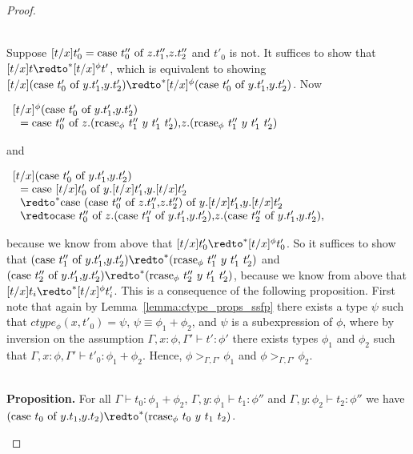 \begin{proof}
\begin{itemize}
    \ \\
    Suppose $[t/x]t'_0 = \mbox{case}\ t''_0\ \text{of}\ z\text{.}t''_1\text{,}z\text{.}t''_2$ and $t'_0$ is not.  It suffices to show that 
    $[t/x]t \redto^* [t/x]^\phi t'$, which is equivalent to showing 
    $[t/x](\ccon{t'_0}{y}{t'_1}{t'_2}) \redto^* [t/x]^\phi (\ccon{t'_0}{y}{t'_1}{t'_2})$.  Now
    \begin{center}
      \begin{math}
        \begin{array}{lll}
          [t/x]^\phi (\mbox{case}\ t'_0\ \text{of}\ y\text{.}t'_1\text{,}y\text{.}t'_2)\\
          \,\,\,\,= \mbox{case}\ t''_0\ \text{of}\ z\text{.}(\mbox{rcase}_{\phi}\ t''_1\ y\ t'_1\ t'_2)\text{,}z\text{.}(\mbox{rcase}_{\phi}\ t''_1\ y\ t'_1\ t'_2)
        \end{array}
      \end{math}
    \end{center}
    and
    \begin{center}
      \begin{math}
        \begin{array}{lll}
          [t/x] (\ccon{t'_0}{y}{t'_1}{t'_2})\\
          \,\,\,\,= \ccon{[t/x]t'_0}{y}{[t/x]t'_1}{[t/x]t'_2} \\
          \,\,\,\,\redto^* \ccon{(\ccon{t''_0}{z}{t''_1}{t''_2})}{y}{[t/x]t'_1}{[t/x]t'_2} \\
          \,\,\,\,\redto \ccon{t''_0}{z}{(\ccon{t''_1}{y}{t'_1}{t'_2})}{(\ccon{t''_2}{y}{t'_1}{t'_2})},
        \end{array}
      \end{math}
    \end{center}
    because we know from above that $[t/x]t'_0 \redto^* [t/x]^\phi t'_0$.  So it suffices to show that
    $(\ccon{t''_1}{y}{t'_1}{t'_2}) \redto^* (\rcase{\phi}{t''_1}{y}{t'_1}{t'_2})$ and
    $(\ccon{t''_2}{y}{t'_1}{t'_2}) \redto^* (\rcase{\phi}{t''_2}{y}{t'_1}{t'_2})$, because we know from above that 
    $[t/x]t_i \redto^* [t/x]^\phi t'_i$.  This is a consequence of the following proposition.  First note that 
    again by Lemma~\ref{lemma:ctype_props_ssfp} there exists a type $\psi$ such that $ctype_\phi(x,t'_0) = \psi$,
    $\psi \equiv \phi_1+\phi_2$, and $\psi$ is a subexpression of $\phi$, where by inversion on the assumption
    $\Gamma,x:\phi,\Gamma' \vdash t':\phi'$ there exists types $\phi_1$ and $\phi_2$ such that 
    $\Gamma,x:\phi,\Gamma' \vdash t'_0:\phi_1+\phi_2$.  Hence, $\phi >_{\Gamma,\Gamma'} \phi_1$ and
    $\phi >_{\Gamma,\Gamma'} \phi_2$.  
    
    \ \\
    {\bf Proposition.} For all $\Gamma \vdash t_0:\phi_1+\phi_2$, $\Gamma,y:\phi_1 \vdash t_1:\phi''$ and
    $\Gamma,y:\phi_2 \vdash t_2:\phi''$ we have 
    $(\ccon{t_0}{y}{t_1}{t_2}) \redto^* (\rcase{\phi}{t_0}{y}{t_1}{t_2})$.
    

\end{itemize}
\end{proof}

